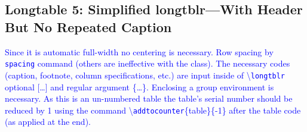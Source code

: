 \documentclass[phd]{ndsu-thesis-2022}
\newcommand\italk[1]{\textcolor{blue}{#1}}  %
\newcommand\cmd[1]{\textbackslash\texttt{#1}}  %
\begin{document}
\subsection{Longtable 5: Simplified longtblr---With Header But No Repeated Caption }
\italk{Since it is automatic full-width no centering is necessary. Row spacing by \texttt{spacing} command (others are ineffective with the class). The necessary codes (caption, footnote, column specifications, etc.) are input inside of \cmd{longtblr} optional [\ldots] and regular argument \{\ldots\}. Enclosing a group environment is necessary. As this is an un-numbered table the table's serial number should be reduced by 1 using the command \cmd{addtocounter}\{table\}\{-1\} after the table code (as applied at the end).}
\end{document}

